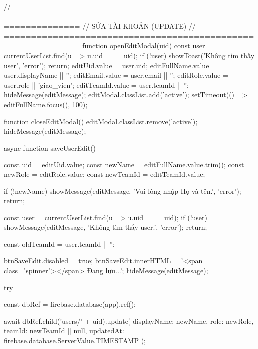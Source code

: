 {            // ============================================================
            // SỬA TÀI KHOẢN (UPDATE)
            // ============================================================
            function openEditModal(uid) {
                const user = currentUserList.find(u => u.uid === uid);
                if (!user) {
                    showToast('Không tìm thấy user', 'error');
                    return;
                }
                editUid.value = user.uid;
                editFullName.value = user.displayName || '';
                editEmail.value = user.email || '';
                editRole.value = user.role || 'giao_vien';
                editTeamId.value = user.teamId || '';
                hideMessage(editMessage);
                editModal.classList.add('active');
                setTimeout(() => editFullName.focus(), 100);
            }

            function closeEditModal() {
                editModal.classList.remove('active');
                hideMessage(editMessage);
            }

            async function saveUserEdit() {
                const uid = editUid.value;
                const newName = editFullName.value.trim();
                const newRole = editRole.value;
                const newTeamId = editTeamId.value;

                if (!newName) {
                    showMessage(editMessage, 'Vui lòng nhập Họ và tên.', 'error');
                    return;
                }

                const user = currentUserList.find(u => u.uid === uid);
                if (!user) {
                    showMessage(editMessage, 'Không tìm thấy user.', 'error');
                    return;
                }

                const oldTeamId = user.teamId || '';

                btnSaveEdit.disabled = true;
                btnSaveEdit.innerHTML = '<span class="spinner"></span> Đang lưu...';
                hideMessage(editMessage);

                try {
                    const dbRef = firebase.database(app).ref();

                    await dbRef.child('users/' + uid).update({
                        displayName: newName,
                        role: newRole,
                        teamId: newTeamId || null,
                        updatedAt: firebase.database.ServerValue.TIMESTAMP
                    });

}}}
